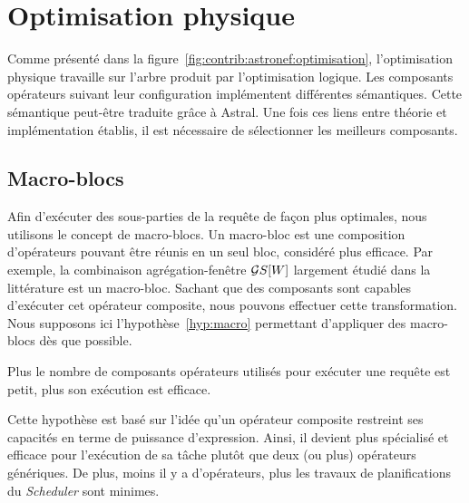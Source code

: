 \section{Optimisation physique}\label{sec:contrib:astronef:physique}
Comme présenté dans la figure~\ref{fig:contrib:astronef:optimisation}, l'optimisation physique travaille sur l'arbre produit par l'optimisation logique. Les composants opérateurs suivant leur configuration implémentent différentes sémantiques. Cette sémantique peut-être traduite grâce à Astral. Une fois ces liens entre théorie et implémentation établis, il est nécessaire de sélectionner les meilleurs composants.

\subsection{Macro-blocs}
Afin d'exécuter des sous-parties de la requête de façon plus optimales, nous utilisons le concept de macro-blocs. Un macro-bloc est une composition d'opérateurs pouvant être réunis en un seul bloc, considéré plus efficace. Par exemple, la combinaison agrégation-fenêtre $\mathcal{G} S[W]$ largement étudié dans la littérature est un macro-bloc. Sachant que des composants sont capables d'exécuter cet opérateur composite, nous pouvons effectuer cette transformation. Nous supposons ici l'hypothèse~\ref{hyp:macro} permettant d'appliquer des macro-blocs dès que possible.
\begin{hyp}\label{hyp:macro}
    Plus le nombre de composants opérateurs utilisés pour exécuter une requête est petit, plus son exécution est efficace.
\end{hyp}

Cette hypothèse est basé sur l'idée qu'un opérateur composite restreint ses capacités en terme de puissance d'expression. Ainsi, il devient plus spécialisé et efficace pour l'exécution de sa tâche plutôt que deux (ou plus) opérateurs génériques. De plus, moins il y a d'opérateurs, plus les travaux de planifications du \textit{Scheduler} sont minimes.

